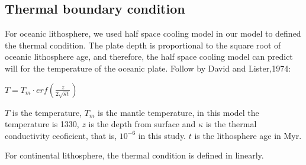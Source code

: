 \subsection{Thermal boundary condition}

For oceanic lithosphere, we used half space cooling model in our model to defined the thermal condition. 
The plate depth is proportional to the square root of oceanic lithosphere age, and therefore, the half space cooling model can predict will for the temperature of the oceanic plate.
Follow by David and Lister,1974:

$T=T_m\cdot {erf}(\frac{z}{2\sqrt{\kappa t}})$

$T$ is the temperature, $T_m$ is the mantle temperature, in this model the temperature is 1330,
$z$ is the depth from surface and $\kappa$ is the thermal conductivity ceoficient, that is, $10^{-6}$ in this study.
$t$ is the lithosphere age in Myr.


For continental lithosphere, the thermal condition is defined in linearly.


